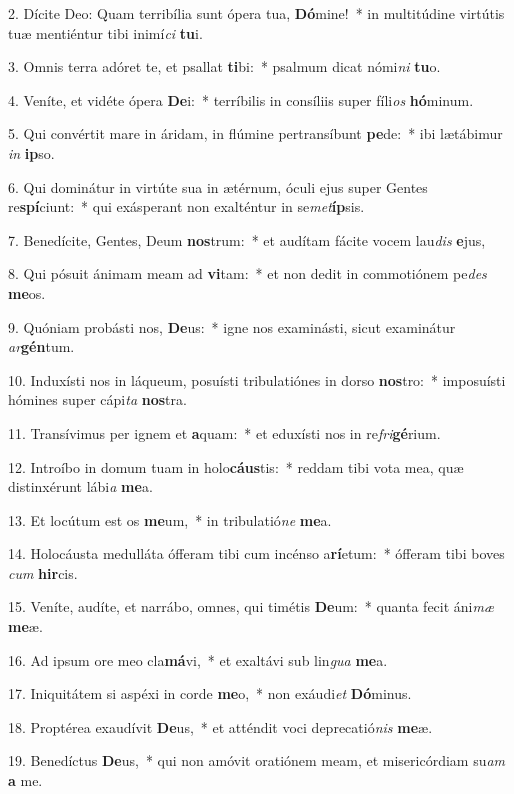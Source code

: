 2. Dícite Deo: Quam terribília sunt ópera tua, \textbf{Dó}mine!~*  in multitúdine virtútis tuæ mentiéntur tibi inimí\textit{ci} \textbf{tu}i.\

3. Omnis terra adóret te, et psallat \textbf{ti}bi:~*  psalmum dicat nómi\textit{ni} \textbf{tu}o.\

4. Veníte, et vidéte ópera \textbf{De}i:~*  terríbilis in consíliis super fíli\textit{os} \textbf{hó}minum.\

5. Qui convértit mare in áridam, in flúmine pertransíbunt \textbf{pe}de:~*  ibi lætábimur \textit{in} \textbf{ip}so.\

6. Qui dominátur in virtúte sua in ætérnum, óculi ejus super Gentes re\textbf{spí}ciunt:~*  qui exásperant non exalténtur in se\textit{met}\textbf{íp}sis.\

7. Benedícite, Gentes, Deum \textbf{nos}trum:~*  et audítam fácite vocem lau\textit{dis} \textbf{e}jus,\

8. Qui pósuit ánimam meam ad \textbf{vi}tam:~*  et non dedit in commotiónem pe\textit{des} \textbf{me}os.\

9. Quóniam probásti nos, \textbf{De}us:~*  igne nos examinásti, sicut examinátur \textit{ar}\textbf{gén}tum.\

10. Induxísti nos in láqueum, posuísti tribulatiónes in dorso \textbf{nos}tro:~*  imposuísti hómines super cápi\textit{ta} \textbf{nos}tra.\

11. Transívimus per ignem et \textbf{a}quam:~*  et eduxísti nos in re\textit{fri}\textbf{gé}rium.\

12. Introíbo in domum tuam in holo\textbf{cáus}tis:~*  reddam tibi vota mea, quæ distinxérunt lábi\textit{a} \textbf{me}a.\

13. Et locútum est os \textbf{me}um,~*  in tribulatió\textit{ne} \textbf{me}a.\

14. Holocáusta medulláta ófferam tibi cum incénso a\textbf{rí}etum:~*  ófferam tibi boves \textit{cum} \textbf{hir}cis.\

15. Veníte, audíte, et narrábo, omnes, qui timétis \textbf{De}um:~*  quanta fecit áni\textit{mæ} \textbf{me}æ.\

16. Ad ipsum ore meo cla\textbf{má}vi,~*  et exaltávi sub lin\textit{gua} \textbf{me}a.\

17. Iniquitátem si aspéxi in corde \textbf{me}o,~*  non exáudi\textit{et} \textbf{Dó}minus.\

18. Proptérea exaudívit \textbf{De}us,~*  et atténdit voci deprecatió\textit{nis} \textbf{me}æ.\

19. Benedíctus \textbf{De}us,~*  qui non amóvit oratiónem meam, et misericórdiam su\textit{am} \textbf{a} me.\

